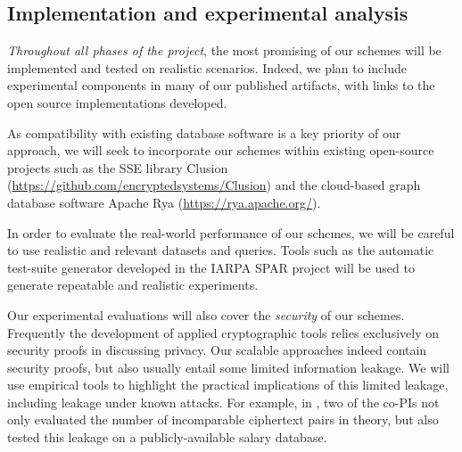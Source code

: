 \subsection{Implementation and experimental analysis}

\emph{Throughout all phases of the project}, the most promising of our
schemes will be implemented and tested on realistic scenarios.
Indeed, we plan to include
experimental components in many of our published artifacts, with
links to the open source implementations developed.

As compatibility with existing database software is a key priority of
our approach, we will seek to incorporate our schemes within existing
open-source projects such as the SSE library Clusion
(\url{https://github.com/encryptedsystems/Clusion}) and
the cloud-based graph database software
Apache Rya (\url{https://rya.apache.org/}).

In order to evaluate the real-world performance of our schemes, we will
be careful to use realistic and relevant datasets and queries. Tools
such as the automatic test-suite generator developed in the IARPA SPAR
project \cite{HH14,varia2015automated} will be used to generate
repeatable and realistic experiments.

Our experimental evaluations will also cover the \emph{security} of our
schemes. Frequently the development of applied cryptographic tools
relies exclusively on security proofs in
discussing privacy. Our scalable approaches indeed contain security
proofs, but also usually entail some limited information leakage.
We will use empirical tools to highlight the practical
implications of this limited leakage, including leakage under known
attacks. For example, in \cite{CCS:RACY16}, two of the co-PIs not only
evaluated the number of incomparable ciphertext pairs in theory, but
also tested this leakage on a publicly-available salary database.
